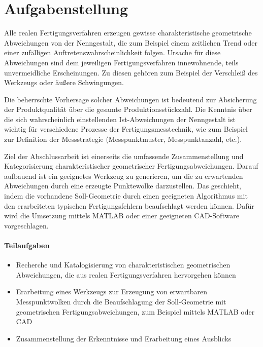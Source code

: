 \section*{Aufgabenstellung}

Alle realen Fertigungsverfahren erzeugen gewisse charakteristische geometrische Abweichungen von der Nenngestalt, die zum Beispiel einem zeitlichen Trend oder einer zufälligen Auftretenswahrscheinlichkeit folgen. Ursache für diese Abweichungen sind dem jeweiligen Fertigungsverfahren innewohnende, teils unvermeidliche Erscheinungen. Zu diesen gehören zum Beispiel der Verschleiß des Werkzeugs oder äußere Schwingungen. 

Die beherrschte Vorhersage solcher Abweichungen ist bedeutend zur Absicherung der Produktqualität über die gesamte Produktionsstückzahl. Die Kenntnis über die sich wahrscheinlich einstellenden Ist-Abweichungen der Nenngestalt ist wichtig für verschiedene Prozesse der Fertigungsmesstechnik, wie zum Beispiel zur Definition der Messstrategie (Messpunktmuster, Messpunktanzahl, etc.). 

Ziel der Abschlussarbeit ist einerseits die umfassende Zusammenstellung und Kategorisierung charakteristischer geometrischer Fertigungsabweichungen. Darauf aufbauend ist ein geeignetes Werkzeug zu generieren, um die zu erwartenden Abweichungen durch eine erzeugte Punktewolke darzustellen.
Das geschieht, indem die vorhandene Soll-Geometrie durch einen geeigneten Algorithmus mit den erarbeiteten typischen Fertigungsfehlern beaufschlagt werden können. Dafür wird die Umsetzung mittels MATLAB oder einer geeigneten CAD-Software vorgeschlagen. 

\paragraph{Teilaufgaben}

\begin{itemize}
	\item Recherche und Katalogisierung von charakteristischen geometrischen Abweichungen, die aus realen Fertigungsverfahren hervorgehen können
	\item Erarbeitung eines Werkzeugs zur Erzeugung von erwartbaren Messpunktwolken durch die Beaufschlagung der Soll-Geometrie mit geometrischen Fertigungsabweichungen, zum Beispiel mittels MATLAB oder CAD
	\item Zusammenstellung der Erkenntnisse und Erarbeitung eines Ausblicks  
\end{itemize}